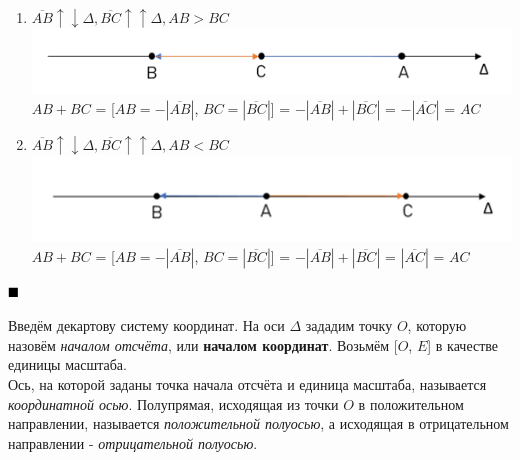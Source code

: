 \documentclass[a4paper, 12pt]{report}
\begin{document}
\begin{enumerate}
		\item $\overline{AB} \uparrow\downarrow \Delta, \overline{BC} \uparrow\uparrow \Delta, AB > BC$\\
		\includegraphics{img/conapr5.png}\\
		$AB+BC$ = [$AB = -|\overline{AB}|$, $BC = |\overline{BC}|$] = $-|\overline{AB}|+|\overline{BC}|$ = $-|\overline{AC}|$ = $AC$\\
		
		\item $\overline{AB} \uparrow\downarrow \Delta, \overline{BC} \uparrow\uparrow \Delta, AB < BC$\\
		\includegraphics{img/conapr6.png}\\
		$AB+BC$ = [$AB = -|\overline{AB}|$, $BC = |\overline{BC}|$] = $-|\overline{AB}|+|\overline{BC}|$ = $|\overline{AC}|$ = $AC$\\
	\end{enumerate}
	$\hfill\blacksquare$
	
	\quad{} Введём декартову систему координат. На оси $\Delta$ зададим точку $O$, которую назовём \textit{началом отсчёта}, или \textbf{началом координат}. Возьмём [$O$, $E$]  в качестве единицы масштаба.\\
	
	\quad{} Ось, на которой заданы точка начала отсчёта и единица масштаба, называется \textit{координатной осью}. Полупрямая, исходящая из точки $O$ в положительном направлении, называется \textit{положительной полуосью}, а исходящая в отрицательном направлении - \textit{отрицательной полуосью}.
	
\end{document}
